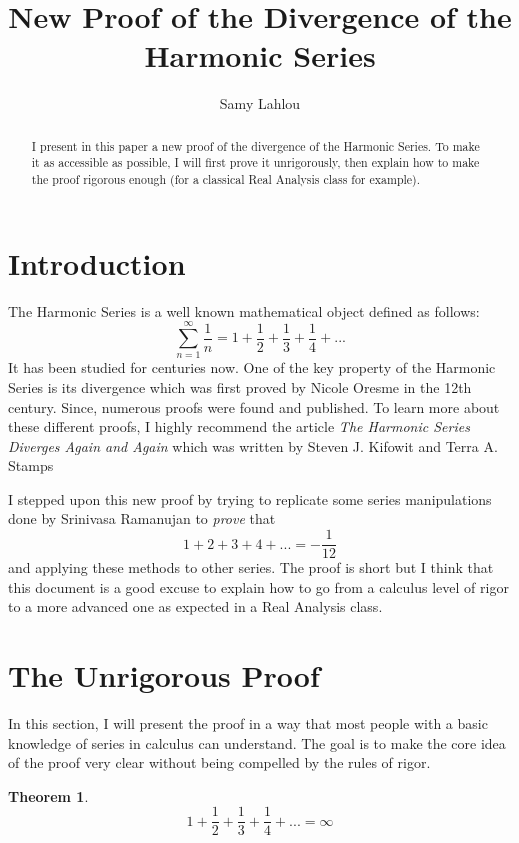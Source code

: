 \documentclass[12pt]{article}
\title{New Proof of the Divergence of the Harmonic Series}
\author{Samy Lahlou}
\date{}
\theoremstyle{definition}
\newtheorem{theorem}{Theorem}[section]
\begin{document}
\maketitle

\begin{abstract}
    I present in this paper a new proof of the divergence of the Harmonic Series. To make it as accessible as possible, I will first prove it unrigorously, then explain how to make the proof rigorous enough (for a classical Real Analysis class for example).
\end{abstract}

\tableofcontents

\newpage

\section{Introduction}
The Harmonic Series is a well known mathematical object defined as follows:
$$\sum_{n=1}^{\infty}\frac{1}{n} = 1 + \frac{1}{2} + \frac{1}{3} + \frac{1}{4} + ...$$
It has been studied for centuries now. One of the key property of the Harmonic Series is its divergence which was first proved by Nicole Oresme in the 12th century. Since, numerous proofs were found and published. To learn more about these different proofs, I highly recommend the article \textit{The Harmonic Series Diverges Again and Again} which was written by Steven J. Kifowit and Terra A. Stamps \cite{harmonicseries} 

I stepped upon this new proof by trying to replicate some series manipulations done by Srinivasa Ramanujan to \textit{prove} that
$$1 + 2 + 3 + 4 + ... = -\frac{1}{12}$$
and applying these methods to other series. The proof is short but I think that this document is a good excuse to explain how to go from a calculus level of rigor to a more advanced one as expected in a Real Analysis class.

\section{The Unrigorous Proof}

In this section, I will present the proof in a way that most people with a basic knowledge of series in calculus can understand. The goal is to make the core idea of the proof very clear without being compelled by the rules of rigor. 

\begin{theorem}
    $$ 1 + \frac{1}{2} + \frac{1}{3} + \frac{1}{4} + ... = \infty$$
\end{theorem}
\end{document}
